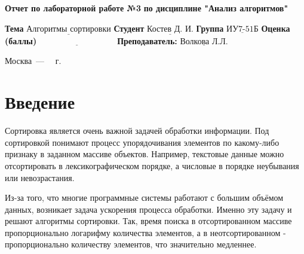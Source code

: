 \documentclass{report}
\begin{document}
\begin{titlepage}
	
	\begin{center}
		\noindent\begin{minipage}{1.3\textwidth}\centering
			\Large\textbf{  Отчет по лабораторной работе №3}\newline
			\textbf{по дисциплине "Анализ алгоритмов"}\newline\newline
		\end{minipage}
	\end{center}
	
	\noindent\textbf{Тема} $\underline{\text{Алгоритмы сортировки}}$\newline\newline
	\noindent\textbf{Студент} $\underline{\text{Костев Д. И.}}$\newline\newline
	\noindent\textbf{Группа} $\underline{\text{ИУ7-51Б}}$\newline\newline
	\noindent\textbf{Оценка (баллы)} $\underline{\text{~~~~~~~~~~~~~~~~~~~~~~~~~~~}}$\newline\newline
	\noindent\textbf{Преподаватель: } $\underline{\text{Волкова Л.Л.}}$\newline\newline\newline
	
	\begin{center}
		\vfill
		Москва~---~\the\year
		~г.
	\end{center}
\end{titlepage}

\setcounter{page}{2}
\tableofcontents
  
\newpage
\chapter*{Введение}


Сортировка является очень важной задачей обработки информации. Под сортировкой понимают процесс упорядочивания элементов по какому-либо признаку в заданном массиве объектов. Например, текстовые данные можно отсортировать в лексикографическом порядке, а числовые в порядке неубывания или невозрастания.

Из-за того, что многие программные системы работают с большим объёмом данных, возникает задача ускорения процесса обработки. Именно эту задачу и решают алгоритмы сортировки. Так, время поиска в отсортированном массиве пропорционально логарифму количества элементов, а в неотсортированном - пропорционально количеству элементов, что значительно медленнее.
\end{document}

